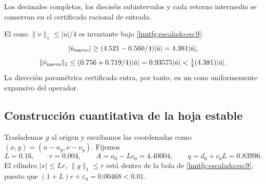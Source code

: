 Los decimales completos, los dieciséis subintervalos y cada retorno intermedio se conservan en el certificado racional de entrada.

El cono \(\|\dot\nu\|_1\le|\dot u|/4\) es invariante bajo \eqref{hmtfg:escalado:eq:9}:
\[
|\dot u_{\rm nuevo}|\ge(4.521-0.560/4)|\dot u|
=4.381|\dot u|,
\]
\begin{equation}
\|\dot\nu_{\rm nueva}\|_1\le(0.756+0.719/4)|\dot u|
=0.93575|\dot u|<\tfrac14(4.381)|\dot u|.
\label{hmtfg:escalado:eq:11}
\end{equation}
La dirección paramétrica certificada entra, por tanto, en un cono uniformemente expansivo del operador.


\subsection{Construcción cuantitativa de la hoja estable}
\label{hmtfg:escalado:5}

Traslademos \(g\) al origen y escribamos las coordenadas como \((x,y)=(u-u_g,\nu-\nu_g)\). Fijemos
\begin{equation}
L=0.16,\qquad r=0.004,\qquad
A=a_0-Lc_0=4.40004,\qquad q=d_0+c_0L=0.83996.
\label{hmtfg:escalado:eq:12}
\end{equation}
El cilindro \(|x|\le Lr\), \(\|y\|_1\le r\) está dentro de la bola de \eqref{hmtfg:escalado:eq:9}, puesto que
\((1+L)r+\varepsilon_0=0.00468<0.01\).


